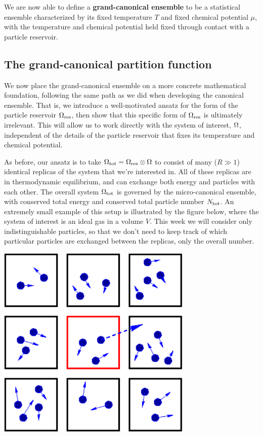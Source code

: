 \begin{shaded}
  We are now able to define a \textbf{grand-canonical ensemble} to be a statistical ensemble characterized by its fixed temperature $T$ and fixed chemical potential $\mu$, with the temperature and chemical potential held fixed through contact with a particle reservoir.
\end{shaded}



\subsection{\label{sec:Zg}The grand-canonical partition function}
We now place the grand-canonical ensemble on a more concrete mathematical foundation, following the same path as we did when developing the canonical ensemble.
That is, we introduce a well-motivated ansatz for the form of the particle reservoir $\Omega_{\text{res}}$, then show that this specific form of $\Omega_{\text{res}}$ is ultimately irrelevant.
This will allow us to work directly with the system of interest, $\Omega$, independent of the details of the particle reservoir that fixes its temperature and chemical potential.

As before, our ansatz is to take $\Omega_{\text{tot}} = \Omega_{\text{res}} \otimes \Omega$ to consist of many ($R \gg 1$) identical replicas of the system \Om that we're interested in.
All of these replicas are in thermodynamic equilibrium, and can exchange both energy and particles with each other.
The overall system $\Omega_{\text{tot}}$ is governed by the micro-canonical ensemble, with conserved total energy \Etot and conserved total particle number $N_{\text{tot}}$.
An extremely small example of this setup is illustrated by the figure below, where the system of interest is an ideal gas in a volume $V$.
This week we will consider only indistinguishable particles, so that we don't need to keep track of which particular particles are exchanged between the replicas, only the overall number.

\begin{center}
  \includegraphics[width=0.7\textwidth]{figs/week06_reservoir.pdf}
\end{center}

